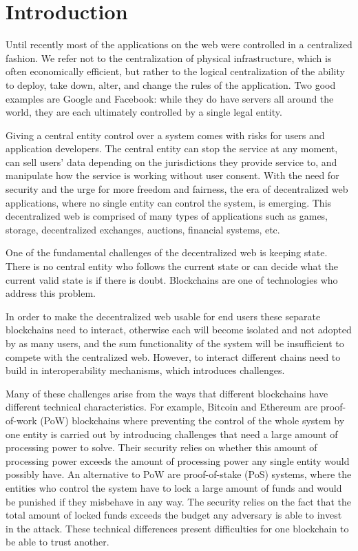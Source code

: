 \section{Introduction}
Until recently most of the applications on the web were controlled in a centralized fashion.
We refer not to the centralization of physical infrastructure, which is often economically efficient, but rather to the logical centralization of the ability to deploy, take down, alter, and change the rules of the application.
Two good examples are Google and Facebook: while they do have servers all around the world, they are each ultimately controlled by a single legal entity.

Giving a central entity control over a system comes with risks for users and application developers.
The central entity can stop the service at any moment, can sell users' data depending on the jurisdictions they provide service to, and manipulate how the service is working without user consent.
With the need for security and the urge for more freedom and fairness, the era of decentralized web applications, where no single entity can control the system, is emerging.
This decentralized web is comprised of many types of applications such as games, storage, decentralized exchanges, auctions, financial systems, etc.

One of the fundamental challenges of the decentralized web is keeping state. There is no central entity who follows the current state or can decide what the current valid state is if there is doubt.
Blockchains are one of technologies who address this problem.

In order to make the decentralized web usable for end users these separate blockchains need to interact, otherwise each will become isolated and not adopted by as many users, and the sum functionality of the system will be insufficient to compete with the centralized web.
However, to interact different chains need to build in interoperability mechanisms, which introduces challenges.

Many of these challenges arise from the ways that different blockchains have different technical characteristics. For example, Bitcoin and Ethereum are proof-of-work (PoW) blockchains where preventing the control of the whole system by one entity is carried out by introducing challenges that need a large amount of processing power to solve. Their security relies on whether this amount of processing power exceeds the amount of processing power any single entity would possibly have. An alternative to PoW are proof-of-stake (PoS) systems, where the entities who control the system have to lock a large amount of funds and would be punished if they misbehave in any way.
The security relies on the fact that the total amount of locked funds exceeds the budget any adversary is able to invest in the attack.
These technical differences present difficulties for one blockchain to be able to trust another.

